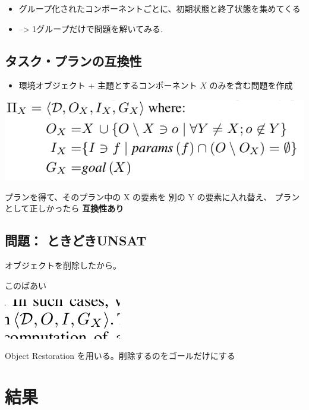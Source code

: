 \begin{itemize}
\item グループ化されたコンポーネントごとに、初期状態と終了状態を集めてくる
\item --> 1グループだけで問題を解いてみる.
\end{itemize}

\subsection{タスク・プランの互換性}
\label{sec-2-6}

\begin{itemize}
\item 環境オブジェクト + 主題とするコンポーネント \(X\) のみを含む問題を作成
\end{itemize}

\includegraphics[width=.9\linewidth]{img/static/abstract-task.png}

プランを得て、そのプラン中の X の要素を 別の Y の要素に入れ替え、
プランとして正しかったら \textbf{互換性あり}

\subsection{問題： ときどきUNSAT}
\label{sec-2-7}

オブジェクトを削除したから。

このばあい

\includegraphics[width=.9\linewidth]{img/static/restoration.png}

Object Restoration を用いる。削除するのをゴールだけにする

\section{結果}
\label{sec-3}

